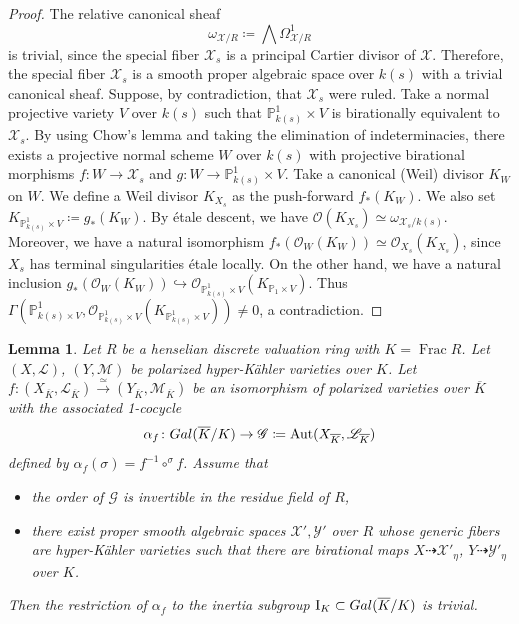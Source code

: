 \documentclass[11pt,reqno,oneside]{amsart}
\numberwithin{equation}{section}
\newtheorem{lemma}[theorem]{Lemma}
\theoremstyle{definition}
\DeclareMathOperator{\Aut}{Aut}
\DeclareMathOperator{\Frac}{Frac}
\newcommand{\Gal}{{\rm Gal}}
\newcommand{\PP}{\mathbb{P}}
\begin{document}
\begin{proof} 
The relative canonical sheaf
\[
\omega_{\mathcal{X}/R} \coloneqq \bigwedge \Omega_{\mathcal{X}/R}^{1}
\]
is trivial, since the special fiber $\mathcal{X}_{s}$ is a principal Cartier divisor of $\mathcal{X}$.
Therefore, the special fiber $\mathcal{X}_{s}$ is a smooth proper algebraic space over $k(s)$ with a trivial canonical sheaf.
Suppose, by contradiction, that $\mathcal{X}_{s}$ were ruled.
Take a normal projective variety $V$ over $k(s)$ such that $\PP^{1}_{k(s)} \times V$ is birationally equivalent to $\mathcal{X}_{s}$.
By using Chow's lemma and taking the elimination of indeterminacies,
there exists a projective normal scheme $W$ over $k(s)$ with projective birational morphisms $f\colon W \rightarrow \mathcal{X}_{s}$ and $g\colon W \rightarrow \PP^{1}_{k(s)} \times V$.
Take a canonical (Weil) divisor $K_{W}$ on $W$.
We define a Weil divisor $K_{X_{s}}$ as the push-forward $f_{\ast} (K_{W})$.
We also set $K_{\PP^{1}_{k(s)} \times V} \coloneqq g _{\ast} (K_{W})$. 
By étale descent, we have $\mathcal{O}(K_{X_{s}}) \simeq \omega_{\mathcal{X}_{s}/k(s)}$.
Moreover, we have a natural isomorphism $f_{\ast}(\mathcal{O}_{W}(K_{W})) \simeq \mathcal{O}_{X_{s}}(K_{X_{s}})$, since $X_{s}$ has terminal singularities étale locally.
On the other hand, we have a natural inclusion
$g_{\ast} (\mathcal{O}_{W}(K_{W})) \hookrightarrow \mathcal{O}_{\PP^{1}_{k(s)} \times V} (K_{\PP_{1} \times V})$.
Thus $\Gamma(\PP^{1}_{k(s) \times V},\mathcal{O}_{\PP^{1}_{k(s)} \times V}(K_{\PP^{1}_{k(s)} \times V})) \neq 0$, a contradiction.
\end{proof}

\begin{lemma}
\label{Lemma:Unramifiedness}
Let $R$ be a henselian discrete valuation ring with $K = \Frac R$.
Let $(X, \mathscr{L})$, $(Y,\mathscr{M})$ be polarized hyper-Kähler varieties over $K$. Let
$f \colon (X_{\overline{K}}, \mathscr{L}_{\overline{K}})
\overset{\simeq}{\to}
(Y_{\overline{K}}, \mathscr{M}_{\overline{K}})$
be an isomorphism of polarized varieties over $\overline{K}$
with the associated 1-cocycle
\[ \alpha_{f} \colon \Gal(\overline{K}/K) \to \mathscr{G} \coloneqq \Aut(X_{\overline{K}}, \mathscr{L}_{\overline{K}}) \]
defined by %
$\alpha_{f} (\sigma) = f^{-1} \circ ^{\sigma} \!f$.
Assume that
\begin{itemize}
\item the order of $\mathscr{G}$ is invertible in the residue field of $R$,
\item there exist proper smooth algebraic spaces
$\mathcal{X}', \mathcal{Y}'$ over $R$
whose generic fibers are hyper-Kähler varieties
such that there are birational maps
$X \dasharrow \mathcal{X}'_{\eta}$,
$Y \dasharrow \mathcal{Y}'_{\eta}$ over $K$.
\end{itemize}
Then the restriction of $\alpha_{f}$ to the inertia subgroup
$\mathrm{I}_K \subset \Gal(\overline{K}/K)$
is trivial.
\end{lemma}
\end{document}
